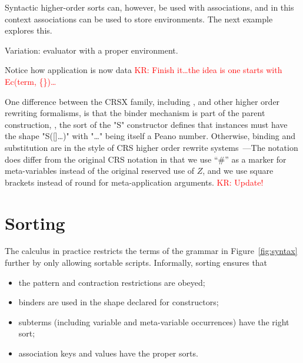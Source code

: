 \documentclass[letterpaper,11pt]{article}
\newcommand{\KR}[1]{\textcolor{red}{KR: #1}}
\begin{document}
Syntactic higher-order sorts can, however, be used with associations, and in this context
associations can be used to store environments. The next example explores this.

\begin{example}
  Variation: evaluator with a proper environment. 
  Notice how application is now data
  \KR{Finish it…the idea is one starts with Ec(term, \{\})…}
\end{example}

\begin{remark}
  One difference between the CRSX family, including \hax, and other higher order rewriting
  formalisms, is that the binder mechanism is part of the parent construction, \eg, the sort of the
  "S" constructor defines that instances must have the shape "S([]…)" with "…" being itself a Peano
  number.  Otherwise, binding and substitution are in the style of CRS higher order rewrite
  systems~\cite{Klop+:tcs1993}---The notation does differ from the original CRS notation in that we
  use ``\#'' as a marker for meta-variables instead of the original reserved use of $Z$, and we use
  square brackets instead of round for meta-application arguments. \KR{Update!}
\end{remark}



\section{Sorting}
\label{sec:sorting}

The \hax calculus in practice restricts the terms of the grammar in Figure~\ref{fig:syntax} further
by only allowing sortable scripts. Informally, sorting ensures that
\begin{itemize}
\item the pattern and contraction restrictions are obeyed;
\item binders are used in the shape declared for constructors;
\item subterms (including variable and meta-variable occurrences) have the right sort;
\item association keys and values have the proper sorts.
\end{itemize}
\end{document}

